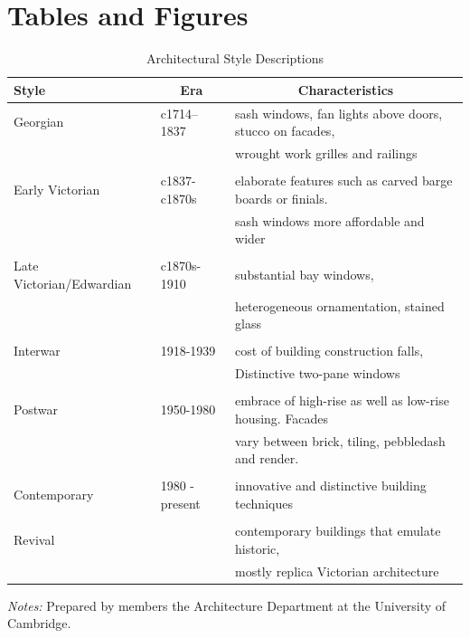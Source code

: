 \documentclass[]{article}
\begin{document}
\newpage
\clearpage

\hypertarget{tables-and-figures}{%
\section{Tables and Figures}\label{tables-and-figures}}

\begin{table}[!htbp] \centering 
  \caption{Architectural Style Descriptions}
  \label{tab:styles_rubric} 
\begin{tabular}{@{\extracolsep{5pt}}lll} 
\toprule
Style & \multicolumn{1}{c}{Era} & \multicolumn{1}{c}{Characteristics} \\ 
\midrule
Georgian & c1714--1837 &  sash windows, fan lights above doors, stucco on facades, \\
& & wrought work grilles and railings\\
& & \\
Early Victorian & c1837-c1870s & elaborate features such as carved barge boards or finials. \\
& & sash windows more affordable and wider \\
& & \\
Late Victorian/Edwardian & c1870s-1910 & substantial bay windows,\\
& & heterogeneous ornamentation, stained glass \\
& & \\
Interwar & 1918-1939 & cost of building construction falls,  \\
 & & Distinctive two-pane windows \\
& & \\
Postwar & 1950-1980 & embrace of high-rise as well as low-rise housing. Facades \\
& &  vary between brick, tiling, pebbledash and render. \\
& & \\
Contemporary & 1980 - present & innovative and distinctive building techniques \\
& & \\
Revival & & contemporary buildings that emulate historic, \\
& & mostly replica Victorian architecture \\
\bottomrule
\end{tabular}

\begin{minipage}{\textwidth}
\vspace{0.25cm}
\singlespacing
\footnotesize \emph{Notes:} Prepared by members the Architecture Department at the University of Cambridge.
\end{minipage}
\end{table}
\end{document}
